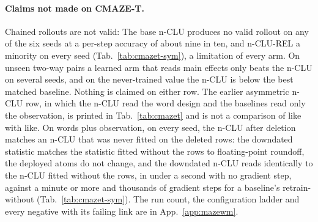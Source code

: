 \documentclass{article} %
\begin{document}
\paragraph{Claims not made on CMAZE-T.} Chained rollouts are not valid: The base n-CLU produces no valid rollout
on any of the six seeds at a per-step accuracy of about nine in ten, and n-CLU-REL a minority on every seed
(Tab.~\ref{tab:cmazet-sym}), a limitation of every arm. On unseen two-way pairs a learned
arm that reads main effects only beats the n-CLU on several seeds, and on the never-trained value the
n-CLU is below the best matched baseline. Nothing is claimed on either row. The earlier asymmetric
n-CLU row, in which the n-CLU read the word design and the baselines read only the observation, is
printed in Tab.~\ref{tab:cmazet} and is not a comparison of like with like. On words plus
observation, on every seed, the n-CLU after deletion matches an n-CLU that was never fitted on the
deleted rows: the downdated statistic matches the statistic fitted without the rows to floating-point
roundoff, the deployed atoms do not change, and the downdated n-CLU reads identically
to the n-CLU fitted without the rows, in under a second with no gradient step,
against a minute or more and thousands of gradient steps for a baseline's retrain-without (Tab.~\ref{tab:cmazet-sym}).
The run count, the configuration ladder and every negative with its failing link are in
App.~\ref{app:mazewm}.

\end{document}

